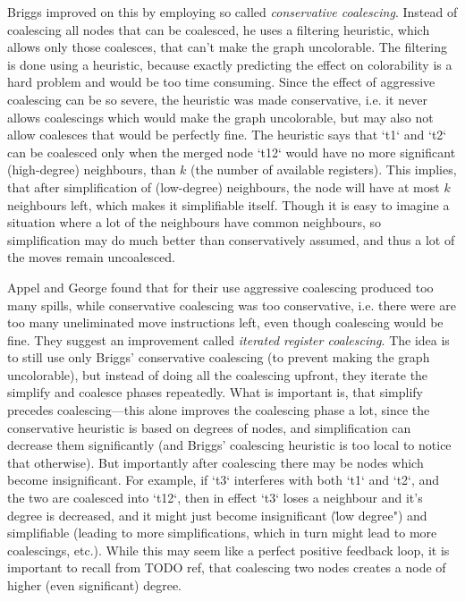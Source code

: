 Briggs improved on this by employing so called {\em conservative coalescing}.
Instead of coalescing all nodes that can be coalesced, he uses a filtering
heuristic, which allows only those coalesces, that can't make the graph
uncolorable. The filtering is done using a heuristic, because exactly predicting
the effect on colorability is a hard problem and would be too time consuming.
Since the effect of aggressive coalescing can be so severe, the heuristic was
made conservative, i.e. it never allows coalescings which would make the graph
uncolorable, but may also not allow coalesces that would be perfectly fine. The
heuristic says that `t1` and `t2` can be coalesced only when the merged node
`t12` would have no more significant (high-degree) neighbours, than $k$ (the
number of available registers). This implies, that after simplification of
(low-degree) neighbours, the node will have at most $k$ neighbours left, which
makes it simplifiable itself. Though it is easy to imagine a situation where a lot
of the neighbours have common neighbours, so simplification may do much better
than conservatively assumed, and thus a lot of the moves remain uncoalesced.

Appel and George found that for their use aggressive coalescing produced too
many spills, while conservative coalescing was too conservative, i.e. there were
are too many uneliminated move instructions left, even though coalescing would
be fine. They suggest an improvement called {\em iterated register coalescing}.
The idea is to still use only Briggs' conservative coalescing (to prevent making
the graph uncolorable), but instead of doing all the coalescing upfront, they
iterate the simplify and coalesce phases repeatedly. What is important is, that
simplify precedes coalescing---this alone improves the coalescing phase a lot,
since the conservative heuristic is based on degrees of nodes, and
simplification can decrease them significantly (and Briggs' coalescing heuristic
is too local to notice that otherwise). But importantly after coalescing
there may be nodes which become insignificant. For example, if `t3` interferes
with both `t1` and `t2`, and the two are coalesced into `t12`, then in effect
`t3` loses a neighbour and it's degree is decreased, and it might just become
insignificant (\"low degree") and simplifiable (leading to more simplifications,
which in turn might lead to more coalescings, etc.). While this may seem like a
perfect positive feedback loop, it is important to recall from TODO ref, that
coalescing two nodes creates a node of higher (even significant) degree.

